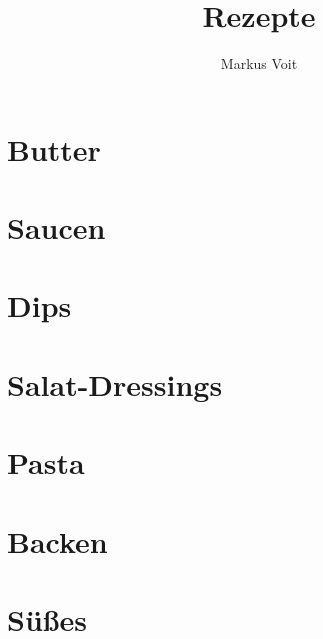 \documentclass[
  DIV=11,%
  pagesize,%
  fontsize=11pt,%
  paper=a4,%
  numbers=noenddot,
]{scrartcl}
\title{Rezepte}
\author{Markus Voit}
\begin{document}
\maketitle
\clearpage
\tableofcontents
\clearpage

\section{Butter}
\newpage
\newpage
\newpage
\newpage

\section{Saucen}
\newpage
\newpage
\newpage
\newpage

\section{Dips}
\newpage

\section{Salat-Dressings}
\newpage

\section{Pasta}
\newpage
\newpage

\section{Backen}
\newpage

\section{Süßes}
\newpage
\end{document}

